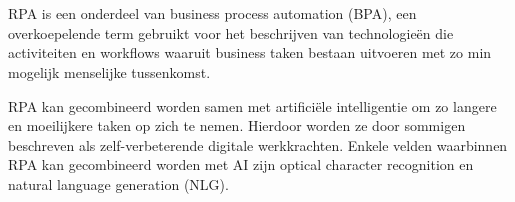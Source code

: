 \chapter{}
\label{ch:stand-van-zaken}







RPA is een onderdeel van business process automation (BPA), een overkoepelende term gebruikt voor het beschrijven van technologieën die activiteiten en workflows waaruit business taken bestaan uitvoeren met zo min mogelijk menselijke tussenkomst. \autocite{everythingRPA}

RPA kan gecombineerd worden samen met artificiële intelligentie om zo langere en moeilijkere taken op zich te nemen. Hierdoor worden ze door sommigen beschreven als zelf-verbeterende digitale werkkrachten. Enkele velden waarbinnen RPA kan gecombineerd worden met AI zijn optical character recognition en natural language generation (NLG). \autocite{everythingRPA}

